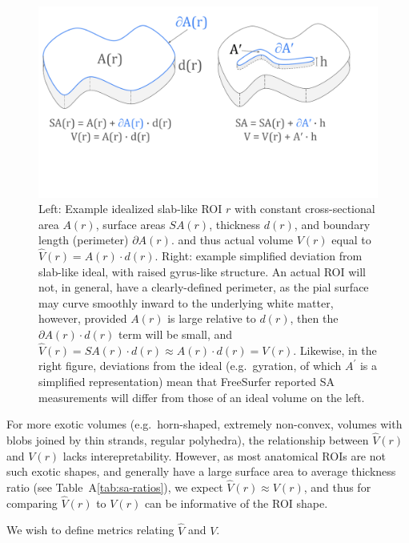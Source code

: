 \documentclass{article}
\begin{document}
\begin{figure}
	\centering
	\includegraphics[width=5in]{figures/ROI_slabs_strip.pdf}
	\caption{Left: Example idealized slab-like ROI \(r\) with constant
	cross-sectional area \(A(r)\), surface areas \(SA(r)\), thickness \(d(r)\),
	and boundary length (perimeter) \(\partial A(r)\). and thus actual volume
	\(V(r)\) equal to \(\hat{V}(r) = A(r) \cdot d(r)\). Right: example
	simplified deviation from slab-like ideal, with raised gyrus-like
	structure. An actual ROI will not, in general, have a clearly-defined
	perimeter, as the pial surface may curve smoothly inward to the underlying
	white matter, however, provided \(A(r)\) is large relative to \(d(r)\),
	then the \(\partial A(r) \cdot d(r)\) term will be small, and \(\hat{V}(r) = SA(r)
	\cdot d(r) \approx A(r) \cdot d(r) = V(r)\). Likewise, in the right figure,
	deviations from the ideal (e.g.\ gyration, of which \(A^{\prime}\) is a simplified
	representation) mean that FreeSurfer reported SA measurements will differ from
	those of an ideal volume on the left.}
	\label{fig:slab}
\end{figure}

For more exotic volumes (e.g.\ horn-shaped, extremely non-convex, volumes
with blobs joined by thin strands, regular polyhedra), the relationship
between \(\hat{V}(r)\) and \(V(r)\) lacks interepretability. However, as most
anatomical ROIs are not such exotic shapes, and generally have a large
surface area to average thickness ratio (see Table~A\ref{tab:sa-ratios}),
we expect \(\hat{V}(r) \approx V(r)\), and thus for
comparing \(\hat{V}(r)\) to \(V(r)\) can be informative of the ROI shape.

We wish to define metrics relating \(\hat{V}\) and \(V\).
\end{document}

